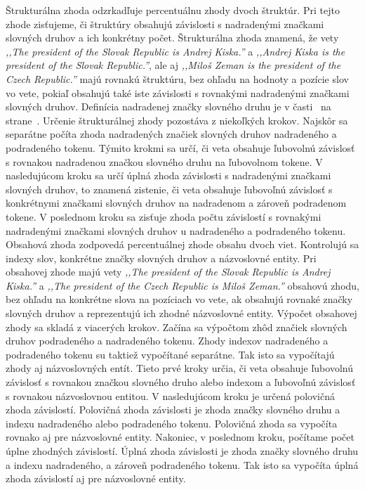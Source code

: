Štrukturálna zhoda odzrkadľuje percentuálnu zhody dvoch štruktúr. Pri tejto zhode zisťujeme, či štruktúry obsahujú závislosti s nadradenými značkami slovných druhov a ich konkrétny počet. Štrukturálna zhoda znamená, že vety \textit{,,The president of the Slovak Republic is Andrej Kiska.''} a \textit{,,Andrej Kiska is the president of the Slovak Republic.''}, ale aj \textit{,,Miloš Zeman is the president of the Czech Republic.''} majú rovnakú štruktúru, bez ohľadu na hodnoty a pozície slov vo vete, pokiaľ obsahujú také iste závislosti s rovnakými nadradenými značkami slovných druhov. Definícia nadradenej značky slovného druhu je v časti~ na strane~\pageref{paragraph:superior_pos_tag}. Určenie štrukturálnej zhody pozostáva z niekoľkých krokov. Najskôr sa separátne počíta zhoda nadradených značiek slovných druhov nadradeného a podradeného tokenu. Týmito krokmi sa určí, či veta obsahuje ľubovolnú závislosť s rovnakou nadradenou značkou slovného druhu na ľubovolnom tokene. V nasledujúcom kroku sa určí úplná zhoda závislosti s nadradenými značkami slovných druhov, to znamená zistenie, či veta obsahuje ľubovoľnú závislosť s konkrétnymi značkami slovných druhov na nadradenom a zároveň podradenom tokene. V poslednom kroku sa zisťuje zhoda počtu závislostí s rovnakými nadradenými značkami slovných druhov u nadradeného a podradeného tokenu. \\

Obsahová zhoda zodpovedá percentuálnej zhode obsahu dvoch viet. Kontrolujú sa indexy slov, konkrétne značky slovných druhov a názvoslovné entity. Pri obsahovej zhode majú vety \textit{,,The president of the Slovak Republic is Andrej Kiska.''} a \textit{,,The president of the Czech Republic is Miloš Zeman.''} obsahovú zhodu, bez ohľadu na konkrétne slova na pozíciach vo vete, ak obsahujú rovnaké značky slovných druhov a reprezentujú ich zhodné názvoslovné entity. Výpočet obsahovej zhody sa skladá z viacerých krokov. Začína sa výpočtom zhôd značiek slovných druhov podradeného a nadradeného tokenu. Zhody indexov nadradeného a podradeného tokenu su taktiež vypočítané separátne. Tak isto sa vypočítajú zhody aj názvoslovných entít. Tieto prvé kroky určia, či veta obsahuje ľubovolnú závislosť s rovnakou značkou slovného druho alebo indexom a ľubovoľnú závislosť s rovnakou názvoslovnou entitou. V nasledujúcom kroku je určená polovičná zhoda závislostí. Polovičná zhoda závislosti je zhoda značky slovného druhu a indexu nadradeného alebo podradeného tokenu. Polovičná zhoda sa vypočíta rovnako aj pre názvoslovné entity. Nakoniec, v poslednom kroku, počítame počet úplne zhodných závislostí. Úplná zhoda závislosti je zhoda značky slovného druhu a indexu nadradeného, a zároveň podradeného tokenu. Tak isto sa vypočíta úplná zhoda závislostí aj pre názvoslovné entity. \\

